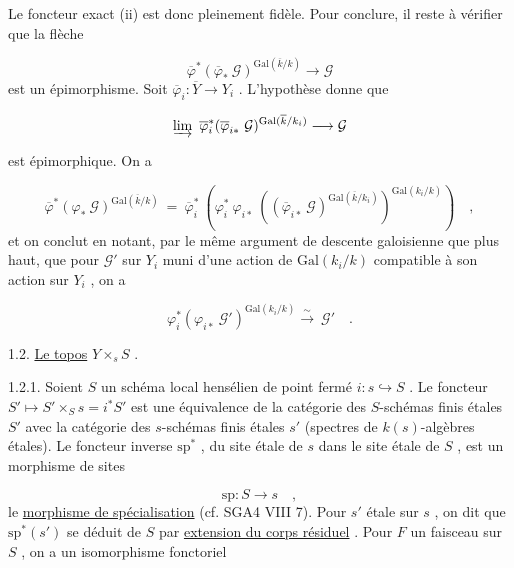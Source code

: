 Le foncteur exact (ii) est donc pleinement fidèle. Pour conclure, il reste à vérifier que la flèche

\begin{equation*}
\overline{\varphi}^*(\overline{\varphi}_* \ \mathcal{G})^{\mathrm{Gal}(\overline{k}/k)} \longrightarrow \mathcal{G}
\end{equation*}
est un épimorphisme. Soit $\overline{\varphi}_i : \overline{Y} \to Y_i$ . L'hypothèse donne que

\begin{equation*}
\varinjlim \ \overline{\varphi}_i^*(\overline{\varphi}_{i*} \ \mathcal{G})^{\mathrm{Gal}(\overline{k}/k_i)} \longrightarrow \mathcal{G} 
\end{equation*}


 est épimorphique. On a

\begin{equation*}
\overline{\varphi}^*(\varphi_* \ \mathcal{G})^{\mathrm{Gal}(\overline{k}/k)} \ = \ \overline{\varphi}_i^* \ (\varphi_i^* \ \varphi_{i*} \ ((\overline{\varphi}_{i*} \ \mathcal{G})^{\mathrm{Gal}(\overline{k}/k_i)})^{\mathrm{Gal}(k_i/k)}) \quad ,
\end{equation*}
et on conclut en notant, par le même argument de descente galoisienne que plus haut, que pour $\mathcal{G}'$ sur $Y_i$ muni d'une action de $\mathrm{Gal}(k_i/k)$ compatible à son action sur $Y_i$ , on a

\begin{equation*}
\varphi_i^*(\varphi_{i*} \ \mathcal{G}')^{\mathrm{Gal}(k_i/k)} \overset{\sim}{\longrightarrow} \ \mathcal{G}' \quad .
\end{equation*}

1.2. \underline{Le topos} $Y \times_s S$ .

1.2.1. Soient $S$ un schéma local hensélien de point fermé $i : s \hookrightarrow S$ . Le foncteur $S' \longmapsto S' \times_S s = i^* S'$ est une équivalence de la catégorie des $S$-schémas finis étales $S'$ avec la catégorie des $s$-schémas finis étales $s'$ (spectres de $k(s)$-algèbres étales). Le foncteur inverse $\mathrm{sp}^*$ , du site étale de $s$ dans le site étale de $S$ , est un morphisme de sites

\begin{equation*}
\mathrm{sp} : S \longrightarrow s \quad ,
\end{equation*}
le \underline{morphisme de spécialisation} (cf. SGA4 VIII 7). Pour $s'$ étale sur $s$ , on dit que $\mathrm{sp}^*(s')$ se déduit de $S$ par \underline{extension du corps résiduel} . Pour $F$ un faisceau sur $S$ , on a un isomorphisme fonctoriel

